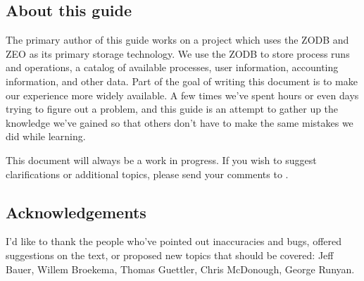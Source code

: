 \subsection{About this guide}

The primary author of this guide works on a project which uses the
ZODB and ZEO as its primary storage technology.  We use the ZODB to
store process runs and operations, a catalog of available processes,
user information, accounting information, and other data.  Part of the
goal of writing this document is to make our experience more widely
available.  A few times we've spent hours or even days trying to
figure out a problem, and this guide is an attempt to gather up the
knowledge we've gained so that others don't have to make the same
mistakes we did while learning.

This document will always be a work in progress.  If you wish to
suggest clarifications or additional topics, please send your comments to
.  

\subsection{Acknowledgements}

I'd like to thank the people who've pointed out inaccuracies and bugs,
offered suggestions on the text, or proposed new topics that should be
covered: Jeff Bauer, Willem Broekema, Thomas Guettler,
Chris McDonough, George Runyan.
